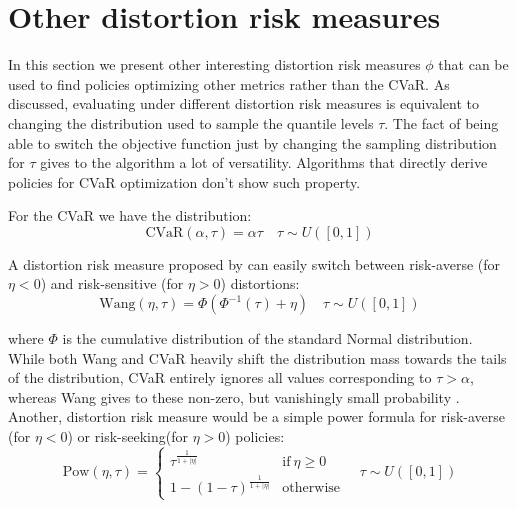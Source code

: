 \section{Other distortion risk measures}

In this section we present other interesting distortion risk measures $\phi$ that can be used
to find policies optimizing other metrics rather than the CVaR.
As discussed, evaluating under different distortion risk measures is equivalent to
changing the distribution used to sample the quantile levels $\tau$.
The fact of being able to switch the objective function just by changing the sampling distribution
for $\tau$ gives to the algorithm a lot of versatility.
Algorithms that directly derive policies for CVaR optimization \citep{Chow2014,Tamar2015a}
don't show such property.

For the CVaR we have the distribution:
\begin{equation}
    \text{CVaR}(\alpha, \tau)=\alpha\tau \quad \tau \sim U([0,1])
\end{equation}

A distortion risk measure proposed by \citet{Wang2000} can easily switch between
risk-averse (for $\eta<0$) and risk-sensitive (for $\eta>0$) distortions:
\begin{equation}
    \text{Wang}(\eta, \tau) = \Phi (\Phi ^{-1}(\tau) + \eta) \quad \tau \sim U([0,1])
\end{equation}

where $\Phi$ is the cumulative distribution of the standard Normal distribution.\\
While both Wang and CVaR heavily shift the distribution mass towards the
tails of the distribution,  CVaR entirely ignores all values corresponding to $\tau>\alpha$,
whereas Wang gives to these non-zero, but vanishingly small probability \citep{Dabney2018b}.\\
Another, distortion risk measure would be a simple power formula
for risk-averse (for $\eta<0$) or risk-seeking(for $\eta>0$) policies:
\begin{equation}
    \text{Pow}(\eta,\tau)  = \left\{
	    \begin{array}{ll}
		 \tau ^ {\frac{1}{1+|\eta|}}      & \mathrm{if\ } \eta \ge 0 \\
		 1-(1-\tau)^{\frac{1}{1+|\eta|}}      & \mathrm{otherwise }
        \end{array}
        \right.
    \quad \tau \sim U([0,1])
\end{equation}

